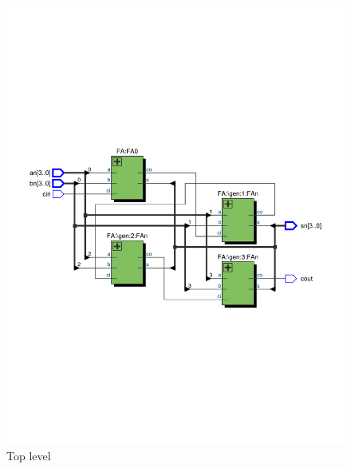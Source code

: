\documentclass[13pt,a4paper]{report}
\begin{document}
\begin{figure}[H]
\centering
\includegraphics[scale=0.6, clip, trim={0cm 8cm 0cm 9cm}]{images/Exc1_RTL.pdf}
\caption*{Top level}
\end{figure}
\end{document}
